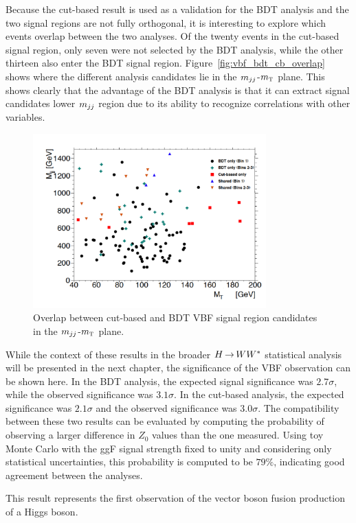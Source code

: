 Because the cut-based result is used as a validation for the BDT analysis and the two signal regions are not fully orthogonal, it is interesting to explore which events overlap between the two analyses. Of the twenty events in the cut-based signal region, only seven were not selected by the BDT analysis, while the other thirteen also enter the BDT signal region. Figure~\ref{fig:vbf_bdt_cb_overlap} shows where the different analysis candidates lie in the $m_{jj}$-$m_{\textrm{\footnotesize\sc t}}$ plane. This shows clearly that the advantage of the BDT analysis is that it can extract signal candidates lower $m_{jj}$ region due to its ability to recognize correlations with other variables. 

\begin{figure}[h!]
  \centering
  \captionsetup{justification=centering}
  \includegraphics[width=0.8\textwidth]{figures/OverlapFig}
  \caption{Overlap between cut-based and BDT VBF signal region candidates in the $m_{jj}$-$m_{\textrm{\footnotesize\sc t}}$ plane.}
  \label{fig:vbf_bdt_cb_overlay}
\end{figure}

While the context of these results in the broader $H{\,{\rightarrow}\,}WW^\ast$ statistical analysis will be presented in the next chapter, the significance of the VBF observation can be shown here. In the BDT analysis, the expected signal significance was $2.7\sigma$, while the observed significance was $3.1\sigma$. In the cut-based analysis, the expected significance was $2.1\sigma$ and the observed significance was $3.0\sigma$. The compatibility between these two results can be evaluated by computing the probability of observing a larger difference in $Z_0$ values than the one measured. Using toy Monte Carlo with the ggF signal strength fixed to unity and considering only statistical uncertainties, this probability is computed to be $79\%$, indicating good agreement between the analyses. 

This result represents the first observation of the vector boson fusion production of a Higgs boson. 
